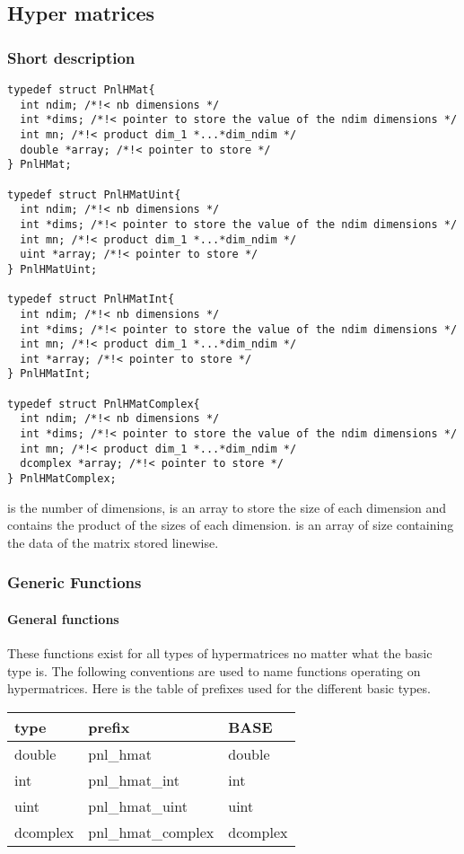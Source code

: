 \subsection{Hyper matrices}
\subsubsection{Short description}

\begin{verbatim}
typedef struct PnlHMat{
  int ndim; /*!< nb dimensions */ 
  int *dims; /*!< pointer to store the value of the ndim dimensions */ 
  int mn; /*!< product dim_1 *...*dim_ndim */
  double *array; /*!< pointer to store */
} PnlHMat;

typedef struct PnlHMatUint{
  int ndim; /*!< nb dimensions */ 
  int *dims; /*!< pointer to store the value of the ndim dimensions */ 
  int mn; /*!< product dim_1 *...*dim_ndim */
  uint *array; /*!< pointer to store */
} PnlHMatUint;

typedef struct PnlHMatInt{
  int ndim; /*!< nb dimensions */ 
  int *dims; /*!< pointer to store the value of the ndim dimensions */ 
  int mn; /*!< product dim_1 *...*dim_ndim */
  int *array; /*!< pointer to store */
} PnlHMatInt;

typedef struct PnlHMatComplex{
  int ndim; /*!< nb dimensions */ 
  int *dims; /*!< pointer to store the value of the ndim dimensions */ 
  int mn; /*!< product dim_1 *...*dim_ndim */
  dcomplex *array; /*!< pointer to store */
} PnlHMatComplex;
\end{verbatim}
 is the number of dimensions,  is an array to store the
size of each dimension and  contains the product of the sizes of each
dimension.  is an array of size  containing the data of the
matrix stored linewise.


\subsubsection{Generic Functions}
\paragraph{General functions}
These functions exist for all types of hypermatrices no matter what the basic type
is. The following conventions are used to name functions operating on hypermatrices.
Here is the table of prefixes used for the different basic types.

\begin{center}
  \begin{tabular}[t]{lll}
    type & prefix & BASE\\
    \hline
    double & pnl_hmat & double \\
    \hline
    int & pnl_hmat_int & int \\
    \hline
    uint & pnl_hmat_uint & uint\\
    \hline
    dcomplex & pnl_hmat_complex & dcomplex
  \end{tabular}
\end{center}

